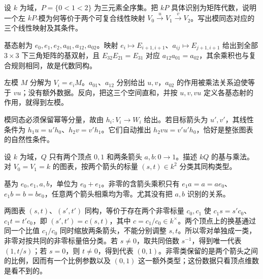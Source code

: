 \begin{exercise}\label{b4:ex:01-chain-category-algebra}
	设 \(k\) 为域，\(P=\{0<1<2\}\) 为三元素全序集。把 \(kP\) 具体识别为矩阵代数，说明一个左 \(kP\)-模为何等价于两个可复合线性映射 \(V_0\xrightarrow{u}V_1\xrightarrow{v}V_2\)。写出模同态对应的三个线性映射及其条件。
\end{exercise}
\begin{solution}
	基态射为 \(e_0,e_1,e_2,a_{01},a_{12},a_{02}\)。映射 \(e_i\mapsto E_{i+1,i+1}\)、\(a_{ij}\mapsto E_{j+1,i+1}\) 给出到全部 \(3\times3\) 下三角矩阵的基双射，且 \(E_{32}E_{21}=E_{31}\) 对应 \(a_{12}a_{01}=a_{02}\)，其余乘积也与复合规则相同，故是代数同构。

	左模 \(M\) 分解为 \(V_i=e_iM\)。\(a_{01}\)、\(a_{12}\) 分别给出 \(u,v\)，\(a_{02}\) 的作用被乘法关系迫使等于 \(vu\)；没有额外数据。反向，把这三个空间直和，并按 \(u,v,vu\) 定义各基态射的作用，就得到左模。

	模同态必须保留幂等分量，故由 \(h_i:V_i\to W_i\) 给出。若目标箭头为 \(u',v'\)，其线性条件为 \(h_1u=u'h_0\)、\(h_2v=v'h_1\)。它们自动推出 \(h_2vu=v'u'h_0\)，恰好是整张图表的自然性条件。
\end{solution}

\begin{exercise}\label{b4:ex:01-parallel-arrows-algebra}
	设 \(k\) 为域，\(Q\) 只有两个顶点 \(0,1\) 和两条箭头 \(a,b:0\to1\)。描述 \(kQ\) 的基与乘法。对 \(V_0=V_1=k\) 的图表，按两个箭头的标量 \((s,t)\in k^2\) 分类其同构类型。
\end{exercise}
\begin{solution}
	基为 \(e_0,e_1,a,b\)，单位为 \(e_0+e_1\)。非零的含箭头乘积只有 \(e_1a=a=ae_0\)、\(e_1b=b=be_0\)，任意两个箭头相乘均为零。尤其没有把 \(a,b\) 识别的关系。

	两图表 \((s,t)\)、\((s',t')\) 同构，等价于存在两个非零标量 \(c_0,c_1\) 使 \(c_1s=s'c_0\)、\(c_1t=t'c_0\)，即 \((s',t')=c(s,t)\)，其中 \(c=c_1/c_0\in k^\times\)。两个顶点上的换基通过同一个比值 \(c_1/c_0\) 同时缩放两条箭头，不能分别调整 \(s,t\)。所以零对单独成一类，非零对按共同的非零标量倍分类。若 \(s\ne0\)，取共同倍数 \(s^{-1}\)，得到唯一代表 \((1,t/s)\)；若 \(s=0\)，则 \(t\ne0\)，得到代表 \((0,1)\)。非零类保留的是两个箭头之间的比例，因而有一个比例参数以及 \((0,1)\) 这一额外类型；这份数据只看顶点维数是看不到的。
\end{solution}

